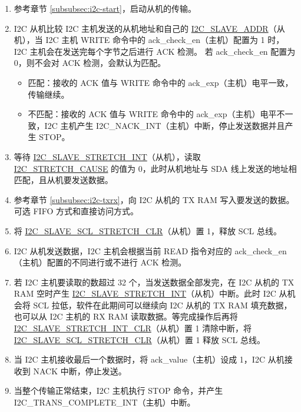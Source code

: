\documentclass[main\_\_CN.tex]{subfiles}
\begin{document}
\begin{enumerate}
\item 参考章节 \ref{subsubsec:i2c-start}，启动从机的传输。
\item I2C 从机比较 I2C 主机发送的从机地址和自己的 \hyperref[fielddesc:I2CSLAVEADDR]{I2C\_SLAVE\_ADDR}（从机），当 I2C 主机 WRITE 命令中的 ack\_check\_en（主机）配置为 1 时，I2C 主机会在发送完每个字节之后进行 ACK 检测。 若 ack\_check\_en 配置为 0，则不会对 ACK 检测，会默认为匹配。
\begin{itemize}
\item 匹配：接收的 ACK 值与 WRITE 命令中的 ack\_exp（主机）电平一致，传输继续。
\item 不匹配：接收的 ACK 值与 WRITE 命令中的 ack\_exp（主机）电平不一致，I2C 主机产生 I2C\_NACK\_INT（主机）中断，停止发送数据并且产生 STOP。
\end{itemize}

\item 等待 \hyperref[int:i2c-slave-stretch]{I2C\_SLAVE\_STRETCH\_INT}（从机），读取 \hyperref[fielddesc:I2CSTRETCHCAUSE]{I2C\_STRETCH\_CAUSE} 的值为 0，此时从机地址与 SDA 线上发送的地址相匹配，且从机要发送数据。
\item 参考章节 \ref{subsubsec:i2c-txrx}，向 I2C 从机的 TX RAM 写入要发送的数据。可选 FIFO 方式和直接访问方式。
\item 将 \hyperref[fielddesc:I2CSLAVESCLSTRETCHCLR]{I2C\_SLAVE\_SCL\_STRETCH\_CLR}（从机）置 1，释放 SCL 总线。

\item I2C 从机发送数据，I2C 主机会根据当前 READ 指令对应的 ack\_check\_en（主机）配置的不同进行或不进行 ACK 检测。
\item 若 I2C 主机要读取的数超过 32 个，当发送数据全部发完，在 I2C 从机的 TX RAM 空时产生 \hyperref[int:i2c-slave-stretch]{I2C\_SLAVE\_STRETCH\_INT}（从机）中断。此时 I2C 从机会将 SCL 拉低，软件在此期间可以继续向 I2C 从机的 TX RAM 填充数据，也可以从 I2C 主机的 RX RAM 读取数据。等完成操作后再将 \hyperref[fielddesc:I2CSLAVESTRETCHINTCLR]{I2C\_SLAVE\_STRETCH\_INT\_CLR}（从机）置 1 清除中断，将 \hyperref[fielddesc:I2CSLAVESCLSTRETCHCLR]{I2C\_SLAVE\_SCL\_STRETCH\_CLR}（从机）置 1 释放 SCL 总线。

\item 当 I2C 主机接收最后一个数据时，将 ack\_value（主机）设成 1，I2C 从机接收到 NACK 中断，停止发送。

\item 当整个传输正常结束，I2C 主机执行 STOP 命令，并产生 I2C\_TRANS\_COMPLETE\_INT（主机）中断。

\end{enumerate}
\end{document}
